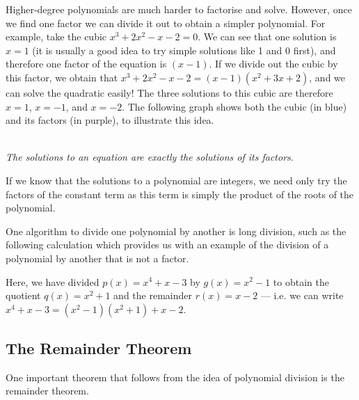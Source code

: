 \documentclass[a4paper,10pt,titlepage]{article}
\theoremstyle{definition}
\begin{document}
Higher-degree polynomials are much harder to factorise and solve. However,
once we find one factor we can divide it out to obtain a simpler polynomial. For example,
take the cubic $ x^3 + 2x^2 - x - 2 = 0$. We can see that one solution is $ x = 1 $ (it
is usually a good idea to try simple solutions like 1 and 0 first), and therefore one
factor of the equation is $ (x-1) $. If we divide out the cubic by this factor, we obtain
that $ x^3 + 2x^2 - x - 2 = (x-1)(x^2+3x+2) $, and we can solve the quadratic easily! The
three solutions to this cubic are therefore $ x = 1 $, $ x = -1 $, and $ x = -2 $. The following
graph shows both the cubic (in blue) and its factors (in purple), to illustrate this idea.

\begin{center}\\
\textit{The solutions to an equation are exactly the solutions of its factors.}
\end{center}

If we know that the solutions to a polynomial are integers, we need only try the factors
of the constant term as this term is simply the product of the roots of the polynomial.

One algorithm to divide one polynomial by another is long division, such as the following
calculation which provides us with an example of the division of a polynomial by another that is not a factor.

\begin{center}
\end{center}

Here, we have divided $ p(x) = x^4 + x - 3 $ by $ g(x) = x^2 - 1 $ to obtain the quotient $ q(x) = x^2 + 1 $
and the remainder $ r(x) = x - 2 $ --- i.e. we can write $ x^4 + x - 3 = (x^2 - 1)(x^2 + 1) + x - 2 $.

\subsection*{The Remainder Theorem}
One important theorem that follows from the idea of polynomial division is the remainder theorem.
\end{document}
